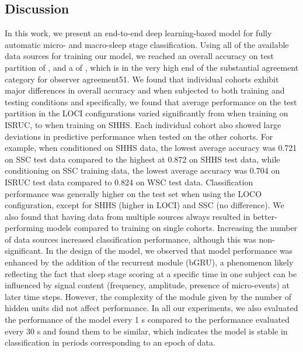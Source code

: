 \subsection{Discussion}
In this work, we present an end-to-end deep learning-based model for fully automatic micro- and macro-sleep stage classification. 
Using all of the available data sources for training our model, we reached an overall accuracy on test partition of , and a \cohen of , which is in the very high end of the substantial agreement category for observer agreement51.
We found that individual cohorts exhibit major differences in overall accuracy and \cohen when subjected to both training and testing conditions and specifically, we found that average performance on the test partition in the LOCI configurations varied significantly from  when training on ISRUC, to  when training on SHHS.
Each individual cohort also showed large deviations in predictive performance when tested on the other cohorts.
For example, when conditioned on SHHS data, the lowest average accuracy was 0.721 on SSC test data compared to the highest at 0.872 on SHHS test data, while conditioning on SSC training data, the lowest average accuracy was 0.704 on ISRUC test data compared to 0.824 on WSC test data.
Classification performance was generally higher on the test set when using the LOCO configuration, except for SHHS (higher in LOCI) and SSC (no difference).
We also found that having data from multiple sources always resulted in better-performing models compared to training on single cohorts.
Increasing the number of data sources increased classification performance, although this was non-significant.
In the design of the model, we observed that model performance was enhanced by the addition of the recurrent module (bGRU), a phenomenon likely reflecting the fact that sleep stage scoring at a specific time in one subject can be influenced by signal content (frequency, amplitude, presence of micro-events) at later time steps.
However, the complexity of the module given by the number of hidden units did not affect performance.
In all our experiments, we also evaluated the performance of the model every 1 s compared to the performance evaluated every 30 s and found them to be similar, which indicates the model is stable in classification in periods corresponding to an epoch of data.

